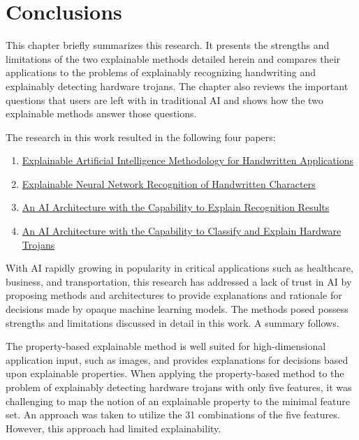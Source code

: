 \chapter{Conclusions} \label{ch:conclusions}

This chapter briefly summarizes this research. It presents the strengths and
limitations of the two explainable methods detailed herein and compares their
applications to the problems of explainably recognizing handwriting and
explainably detecting hardware trojans. The chapter also reviews the important
questions that users are left with in traditional AI and shows how the two
explainable methods answer those questions.

The research in this work resulted in the following four papers:

\begin{enumerate}
    \item \href{https://doi.org/10.1109/NAECON49338.2021.9696413}{Explainable Artificial Intelligence Methodology for Handwritten Applications}\cite{whitten21}
    \item \href{https://doi.org/10.1109/CCWC57344.2023.10099288}{Explainable Neural Network Recognition of Handwritten Characters}\cite{whitten23}
    \item \href{https://doi.org/10.1109/ICMI60790.2024.10586116}{An AI Architecture with the Capability to Explain Recognition Results}\cite{whitten24icmi}
    \item \href{https://doi.org/10.1109/NAECON61878.2024.10670684}{An AI Architecture with the Capability to Classify and Explain Hardware Trojans}\cite{whitten2024naecon}
\end{enumerate}

With AI rapidly growing in popularity in critical applications such as
healthcare, business, and transportation, this research has addressed a lack of
trust in AI by proposing methods and architectures to provide explanations and
rationale for decisions made by opaque machine learning models. The methods
posed possess strengths and limitations discussed in detail in this work. A
summary follows.

The property-based explainable method is well suited for high-dimensional
application input, such as images, and provides explanations for decisions based
upon explainable properties. When applying the property-based method to the
problem of explainably detecting hardware trojans with only five features, it
was challenging to map the notion of an explainable property to the minimal
feature set. An approach was taken to utilize the 31 combinations of the five
features. However, this approach had limited explainability.

